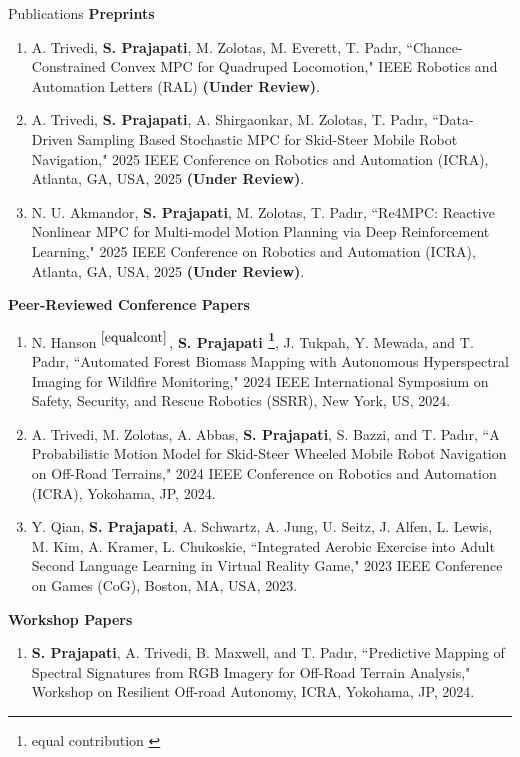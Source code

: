 \documentclass{resume}
\begin{document}
\begin{rSection}{Publications}
\textbf{Preprints}
\vspace{-1mm}
\begin{enumerate}[leftmargin=0.5cm]
\item A. Trivedi, \textbf{S. Prajapati}, M. Zolotas, M. Everett, T. Pad{\i}r, ``Chance-Constrained Convex MPC for Quadruped Locomotion," IEEE Robotics and Automation Letters (RAL) \textbf{(Under Review)}.
     \item A. Trivedi, \textbf{S. Prajapati}, A. Shirgaonkar, M. Zolotas, T. Pad{\i}r, ``Data-Driven Sampling Based Stochastic MPC for Skid-Steer Mobile
Robot Navigation," 2025 IEEE Conference on Robotics and Automation (ICRA), Atlanta, GA, USA, 2025 \textbf{(Under Review)}.
    \item N. U. Akmandor, \textbf{S. Prajapati}, M. Zolotas, T. Pad{\i}r, ``Re4MPC: Reactive Nonlinear MPC for Multi-model Motion Planning via Deep Reinforcement Learning," 2025 IEEE Conference on Robotics and Automation (ICRA), Atlanta, GA, USA, 2025 \textbf{(Under Review)}.
\end{enumerate}
\vspace{-1mm}
\textbf{Peer-Reviewed Conference Papers}
\vspace{-1mm}
\begin{enumerate}[leftmargin=0.5cm]
    \item N. Hanson$^{~\ref{equalcont}}$, \textbf{S. Prajapati \footnote{equal contribution \label{equalcont}}}, J. Tukpah, Y. Mewada, and T. Pad{\i}r, ``Automated Forest Biomass Mapping with Autonomous Hyperspectral
Imaging for Wildfire Monitoring," 2024 IEEE International Symposium on Safety, Security, and Rescue Robotics (SSRR), New York, US, 2024.
    \item A. Trivedi, M. Zolotas, A. Abbas, \textbf{S. Prajapati}, S. Bazzi, and T. Pad{\i}r, ``A Probabilistic Motion Model for Skid-Steer Wheeled Mobile Robot Navigation on Off-Road Terrains," 2024 IEEE Conference on Robotics and Automation (ICRA), Yokohama, JP, 2024.
    
    \item \vspace{-0.3em} Y. Qian, \textbf{S. Prajapati}, A. Schwartz, A. Jung, U. Seitz, J. Alfen, L. Lewis, M. Kim, A. Kramer, L. Chukoskie, ``Integrated Aerobic Exercise into Adult Second Language Learning in Virtual Reality Game," 2023 IEEE Conference on Games (CoG), Boston, MA, USA, 2023.

\end{enumerate}
\vspace{-1mm}
\textbf{Workshop Papers}
\begin{enumerate}[leftmargin=0.5cm]
\item \vspace{-0.3em} \textbf{S. Prajapati}, A. Trivedi, B. Maxwell, and T. Pad{\i}r, ``Predictive Mapping of Spectral Signatures from RGB Imagery for Off-Road Terrain Analysis," Workshop on Resilient Off-road Autonomy, ICRA, Yokohama, JP, 2024.
    

\end{enumerate}
\end{rSection}
\end{document}
